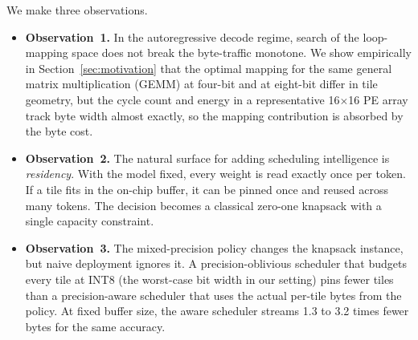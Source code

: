 \documentclass{ieeeaccess}
\begin{document}
We make three observations.
\begin{itemize}
\item \textbf{Observation~1.} In the autoregressive decode regime,
search of the loop-mapping space does not break the byte-traffic
monotone. We show empirically in Section~\ref{sec:motivation} that the
optimal mapping for the same general matrix multiplication (GEMM) at
four-bit and at eight-bit differ in tile geometry, but the cycle count
and energy in a representative 16$\times$16 PE array track byte width
almost exactly, so the mapping contribution is absorbed by the byte
cost.
\item \textbf{Observation~2.} The natural surface for adding scheduling
intelligence is \emph{residency}. With the model fixed, every weight is
read exactly once per token. If a tile fits in the on-chip buffer, it
can be pinned once and reused across many tokens. The decision becomes
a classical zero-one knapsack with a single capacity constraint.
\item \textbf{Observation~3.} The mixed-precision policy changes the
knapsack instance, but naive deployment ignores it. A
precision-oblivious scheduler that budgets every tile at INT8 (the
worst-case bit width in our setting) pins fewer tiles than a
precision-aware scheduler that uses the actual per-tile bytes from the
policy. At fixed buffer size, the aware scheduler streams 1.3 to 3.2
times fewer bytes for the same accuracy.
\end{itemize}
\end{document}
